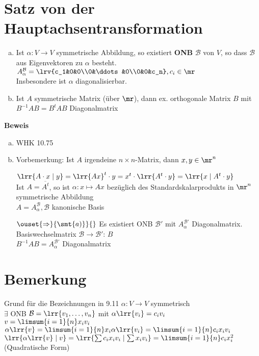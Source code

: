 \section{Satz von der Hauptachsentransformation}
	\begin{enumerate}[a)]
		\item Ist $\alpha: V\rightarrow V$ symmetrische Abbildung, so existiert \textbf{ONB} $\mathcal{B}$ von $V$, so dass $\mathcal{B}$ aus Eigenvektoren zu $\alpha$ besteht.\\
			$A_\alpha^{\mathcal{B}}=\lrv{c_1&0&0\\0&\ddots&0\\0&0&c_n}, c_i\in\mr$\\
			Insbesondere ist $\alpha$ diagonalisierbar.
		\item Ist $A$ symmetrische Matrix (über $\mr$), dann ex. orthogonale Matrix $B$ mit $B^{-1} A B =B^tAB$ Diagonalmatrix
	\end{enumerate}
	\textbf{Beweis}
	\begin{enumerate}[a)]
		\item WHK 10.75
		\item Vorbemerkung: Ist $A$ irgendeine $n\times n$-Matrix, dann $x,y\in\mr^n$
			
			$\lrr{A\cdot x\mid y} = \lrr{Ax}^t\cdot y = x^t\cdot\lrr{A^t\cdot y}=\lrr{x\mid A^t\cdot y}$\\
			Ist $A=\overline{A^t}$, so ist $\alpha: x\mapsto Ax$ bezüglich des Standardskalarprodukts in $\mr^n$ symmetrische Abbildung\\
			$A=A_\alpha^{\mathcal{B}}, \mathcal{B}$ kanonische Basis

			$\ouset{\Rightarrow}{\smt{a)}}{}$ Es existiert ONB $\mathcal{B}'$ mit $A_\alpha^{\mathcal{B}'}$ Diagonalmatrix.\\
			Basiswechselmatrix $\mathcal{B}\rightarrow\mathcal{B}'$: $B$\\
			$B^{-1}AB=A_\alpha^{\mathcal{B}'}$ Diagonalmatrix
	\end{enumerate}

\section{Bemerkung}
	Grund für die Bezeichnungen in 9.11 $\alpha:V\rightarrow V$ symmetrisch\\
	$\exists$ ONB $\mathcal{B}=\lrr{v_1,\dots,v_n}$ mit $\alpha\lrr{v_i}=c_iv_i$\\
	$v=\limsum{i=1}{n} x_iv_i$\\
	$\alpha\lrr{v}=\limsum{i=1}{n} x_i\alpha\lrr{v_i}=\limsum{i=1}{n} c_ix_iv_i$\\
	$\lrr{\alpha\lrr{v}\mid v}=\lrr{\sum c_ix_iv_i\mid\sum x_iv_i}=\limsum{i=1}{n} c_ix_i^2$ (Quadratische Form)

